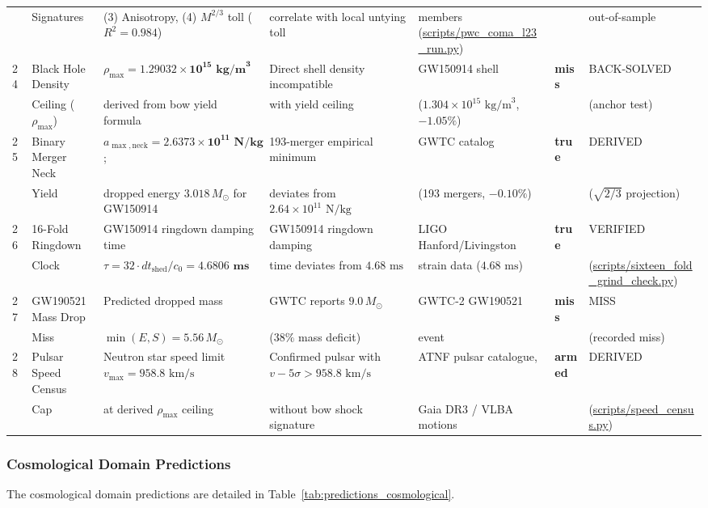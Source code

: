 \documentclass[11pt,a4paper]{article}
\begin{document}
\begin{table}[!htbp]
\begin{tabularx}{\textwidth}{C{0.45cm} L{2.0cm} Y L{2.65cm} L{2.72cm} C{1.2cm} L{2.18cm}}
& Signatures & (3) Anisotropy, (4) $M^{2/3}$ toll ($R^2=0.984$) & correlate with local untying toll & members (\url{scripts/pwc_coma_l23_run.py}) & & out-of-sample \\
24 & Black Hole Density & $\rho_{\max} = \mathbf{1.29032 \times 10^{15}\text{ kg/m}^3}$ & Direct shell density incompatible & GW150914 shell & \textbf{miss} & BACK-SOLVED \\
& Ceiling ($\rho_{\max}$) & derived from bow yield formula & with yield ceiling & ($1.304 \times 10^{15}\text{ kg/m}^3$, $-1.05\%$) & & (anchor test) \\
25 & Binary Merger Neck & $a_{\max,\text{neck}} = \mathbf{2.6373 \times 10^{11}\text{ N/kg}}$; & 193-merger empirical minimum & GWTC catalog & \textbf{true} & DERIVED \\
& Yield & dropped energy $3.018\,M_\odot$ for GW150914 & deviates from $2.64 \times 10^{11}\text{ N/kg}$ & (193 mergers, $-0.10\%$) & & ($\sqrt{2/3}$ projection) \\
26 & 16-Fold Ringdown & GW150914 ringdown damping time & GW150914 ringdown damping & LIGO Hanford/Livingston & \textbf{true} & VERIFIED \\
& Clock & $\tau = 32 \cdot dt_{\text{shed}}/c_0 = \mathbf{4.6806\text{ ms}}$ & time deviates from $4.68\text{ ms}$ & strain data ($4.68\text{ ms}$) & & (\url{scripts/sixteen_fold_grind_check.py}) \\
27 & GW190521 Mass Drop & Predicted dropped mass & GWTC reports $9.0\,M_\odot$ & GWTC-2 GW190521 & \textbf{miss} & MISS \\
& Miss & $\min(E, S) = 5.56\,M_\odot$ & ($38\%$ mass deficit) & event & & (recorded miss) \\
28 & Pulsar Speed Census & Neutron star speed limit $v_{\max} = 958.8\text{ km/s}$ & Confirmed pulsar with $v - 5\sigma > 958.8\text{ km/s}$ & ATNF pulsar catalogue, & \textbf{armed} & DERIVED \\
& Cap & at derived $\rho_{\max}$ ceiling & without bow shock signature & Gaia DR3 / VLBA motions & & (\url{scripts/speed_census.py}) \\
\bottomrule
\end{tabularx}
\end{table}

\subsubsection{Cosmological Domain Predictions}
\label{subsubsec:cosmological_predictions}
The cosmological domain predictions are detailed in Table~\ref{tab:predictions_cosmological}.
\end{document}
